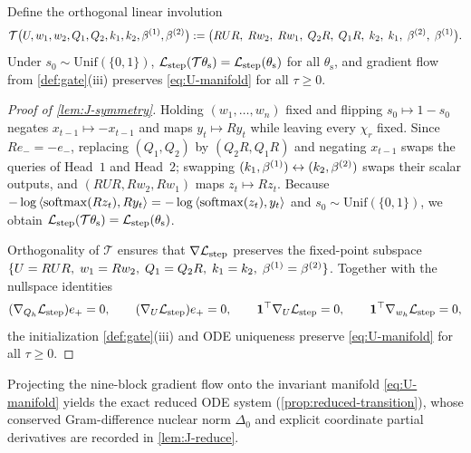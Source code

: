\begin{lemma}
\label{lem:J-symmetry}
\label{lem:U-symmetry}
\label{rem:J-line}
Define the orthogonal linear involution
\[
 \mathcal T\bigl(U, w_1, w_2, Q_1, Q_2, k_1, k_2, \beta^{(1)}, \beta^{(2)}\bigr) := \bigl(RUR,\; Rw_2,\; Rw_1,\; Q_2 R,\; Q_1 R,\; k_2,\; k_1,\; \beta^{(2)},\; \beta^{(1)}\bigr).
\]
Under $s_0 \sim \mathrm{Unif}(\{0,1\})$, $\mathcal L_{\mathrm{step}}(\mathcal T\theta_{\mathrm s}) = \mathcal L_{\mathrm{step}}(\theta_{\mathrm s})$ for all $\theta_{\mathrm s}$, and gradient flow from \cref{def:gate}(iii) preserves \cref{eq:U-manifold} for all $\tau \ge 0$.
\end{lemma}
\begin{proof}[Proof of \cref{lem:J-symmetry}]
Holding $(w_1,\ldots,w_n)$ fixed and flipping $s_0 \mapsto 1 - s_0$ negates $x_{t-1} \mapsto -x_{t-1}$ and maps $y_t \mapsto R y_t$ while leaving every $\chi_r$ fixed. Since $R e_- = -e_-$, replacing $(Q_1, Q_2)$ by $(Q_2 R, Q_1 R)$ and negating $x_{t-1}$ swaps the queries of Head~$1$ and Head~$2$; swapping $(k_1, \beta^{(1)}) \leftrightarrow (k_2, \beta^{(2)})$ swaps their scalar outputs, and $(RUR, Rw_2, Rw_1)$ maps $z_t \mapsto R z_t$. Because $-\log\left\langle \operatorname{softmax}(R z_t),R y_t\right\rangle = -\log\left\langle \operatorname{softmax}(z_t),y_t\right\rangle$ and $s_0 \sim \mathrm{Unif}(\{0,1\})$, we obtain $\mathcal L_{\mathrm{step}}(\mathcal T\theta_{\mathrm s}) = \mathcal L_{\mathrm{step}}(\theta_{\mathrm s})$.

Orthogonality of $\mathcal T$ ensures that $\nabla\mathcal L_{\mathrm{step}}$ preserves the fixed-point subspace $\{U = RUR,\; w_1 = Rw_2,\; Q_1 = Q_2 R,\; k_1 = k_2,\; \beta^{(1)} = \beta^{(2)}\}$. Together with the nullspace identities
\[
  (\nabla_{Q_h}\mathcal L_{\mathrm{step}})e_+ = 0, \qquad
  (\nabla_U\mathcal L_{\mathrm{step}})e_+ = 0, \qquad
  \mathbf 1^\top\nabla_U\mathcal L_{\mathrm{step}} = 0, \qquad
  \mathbf 1^\top\nabla_{w_h}\mathcal L_{\mathrm{step}} = 0,
\]
the initialization \cref{def:gate}(iii) and ODE uniqueness preserve \cref{eq:U-manifold} for all $\tau \ge 0$.
\end{proof}

Projecting the nine-block gradient flow onto the invariant manifold \cref{eq:U-manifold} yields the exact reduced ODE system (\cref{prop:reduced-transition}), whose conserved Gram-difference nuclear norm $\Delta_0$ and explicit coordinate partial derivatives are recorded in \cref{lem:J-reduce}.

